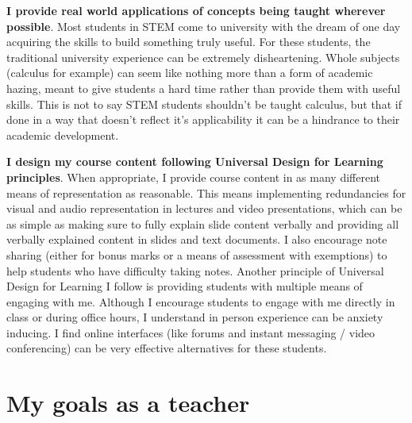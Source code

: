 \documentclass[12pt]{report}
\begin{document}
\noindent
\textbf{I provide real world applications of concepts being taught wherever
possible}. Most students in STEM come to university with the dream of one day
acquiring the skills to build something truly useful. For these students, the
traditional university experience can be extremely disheartening. Whole
subjects (calculus for example) can seem like nothing more than a form of
academic hazing, meant to give students a hard time rather than provide them
with useful skills. This is not to say STEM students shouldn't be taught
calculus, but that if done in a way that doesn't reflect it's applicability
it can be a hindrance to their academic development. 

\noindent
\textbf{I design my course content following Universal Design for Learning
principles}. When appropriate, I provide course content in as many different
means of representation as reasonable. This means implementing redundancies
for visual and audio representation in lectures and video presentations, which
can be as simple as making sure to fully explain slide content verbally and
providing all verbally explained content in slides and text documents. I also
encourage note sharing (either for bonus marks or a means of assessment with
exemptions) to help students who have difficulty taking notes. Another
principle of Universal Design for Learning I follow is providing students with
multiple means of engaging with me. Although I encourage students to engage
with me directly in class or during office hours, I understand in person
experience can be anxiety inducing. I find online interfaces (like forums and
instant messaging / video conferencing) can be very effective alternatives for
these students.

\section{My goals as a teacher}
\label{sec:org1091e9c}
\end{document}
